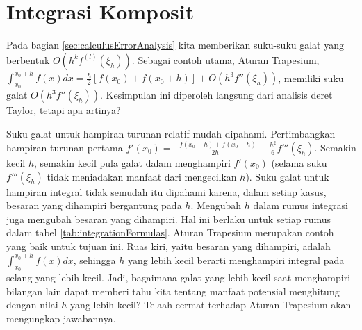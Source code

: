 
\section{\label{sec:Composite}Integrasi Komposit}

Pada bagian \ref{sec:calculusErrorAnalysis} kita memberikan suku-suku
galat yang berbentuk $O(h^{k}f^{(l)}(\xi_{h}))$. Sebagai contoh utama,
Aturan Trapesium, ${\displaystyle \int_{x_{0}}^{x_{0}+h}f(x)dx=\frac{h}{2}\left[f(x_{0})+f(x_{0}+h)\right]+O(h^{3}f''(\xi_{h}))}$,
memiliki suku galat $O(h^{3}f''(\xi_{h}))$. Kesimpulan ini diperoleh
langsung dari analisis deret Taylor, tetapi apa artinya?

Suku galat untuk hampiran turunan relatif mudah dipahami. Pertimbangkan
hampiran turunan pertama ${\displaystyle f'(x_{0})=\frac{-f(x_{0}-h)+f(x_{0}+h)}{2h}+\frac{h^{2}}{6}f'''(\xi_{h})}$.
Semakin kecil $h$, semakin kecil pula galat dalam menghampiri $f'(x_{0})$
(selama suku $f'''(\xi_{h})$ tidak meniadakan manfaat dari mengecilkan
$h$). Suku galat untuk hampiran integral tidak semudah itu dipahami
karena, dalam setiap kasus, besaran yang dihampiri bergantung pada
$h$. Mengubah $h$ dalam rumus integrasi juga mengubah besaran yang
dihampiri. Hal ini berlaku untuk setiap rumus dalam tabel \ref{tab:integrationFormulas}.
Aturan Trapesium merupakan contoh yang baik untuk tujuan ini. Ruas
kiri, yaitu besaran yang dihampiri, adalah $\int_{x_{0}}^{x_{0}+h}f(x)dx$,
sehingga $h$ yang lebih kecil berarti menghampiri integral pada selang
yang lebih kecil. Jadi, bagaimana galat yang lebih kecil saat menghampiri
bilangan lain dapat memberi tahu kita tentang manfaat potensial menghitung
dengan nilai $h$ yang lebih kecil? Telaah cermat terhadap Aturan
Trapesium akan mengungkap jawabannya.

